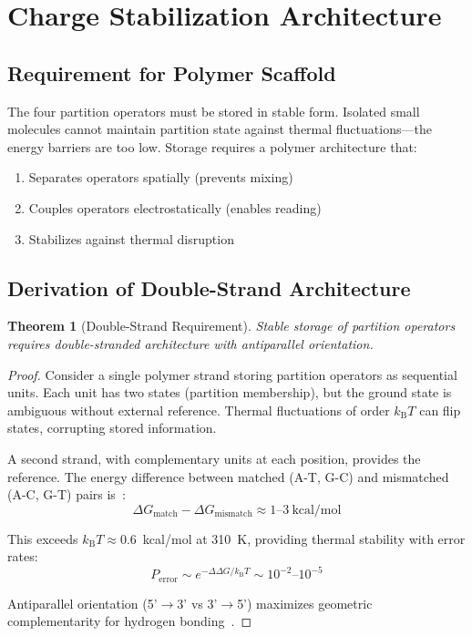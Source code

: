 \documentclass[twocolumn,aps,prb,superscriptaddress,longbibliography,floatfix]{revtex4-2}
\newtheorem{theorem}{Theorem}[section]
\theoremstyle{remark}
\newcommand{\kB}{k_\text{B}}
\begin{document}
\section{Charge Stabilization Architecture}
\label{sec:architecture}

\subsection{Requirement for Polymer Scaffold}

The four partition operators must be stored in stable form. Isolated
small molecules cannot maintain partition state against thermal
fluctuations---the energy barriers are too low. Storage requires a
polymer architecture that:
\begin{enumerate}
    \item Separates operators spatially (prevents mixing)
    \item Couples operators electrostatically (enables reading)
    \item Stabilizes against thermal disruption
\end{enumerate}

\subsection{Derivation of Double-Strand Architecture}

\begin{theorem}[Double-Strand Requirement]
\label{thm:doublestrand}
Stable storage of partition operators requires double-stranded
architecture with antiparallel orientation.
\end{theorem}

\begin{proof}
Consider a single polymer strand storing partition operators as
sequential units. Each unit has two states (partition membership), but
the ground state is ambiguous without external reference. Thermal
fluctuations of order $\kB T$ can flip states, corrupting stored
information.

A second strand, with complementary units at each position, provides
the reference. The energy difference between matched (A-T, G-C) and
mismatched (A-C, G-T) pairs is~\cite{SantaLucia1998}:
\begin{equation}
\Delta G_\text{match} - \Delta G_\text{mismatch} \approx 1\text{--}3~\text{kcal/mol}
\end{equation}

This exceeds $\kB T \approx 0.6$~kcal/mol at 310~K, providing thermal
stability with error rates:
\begin{equation}
P_\text{error} \sim e^{-\Delta\Delta G/\kB T} \sim 10^{-2}\text{--}10^{-5}
\end{equation}

Antiparallel orientation (5'$\to$3' vs 3'$\to$5') maximizes geometric
complementarity for hydrogen bonding~\cite{Franklin1953}.
\end{proof}
\end{document}
